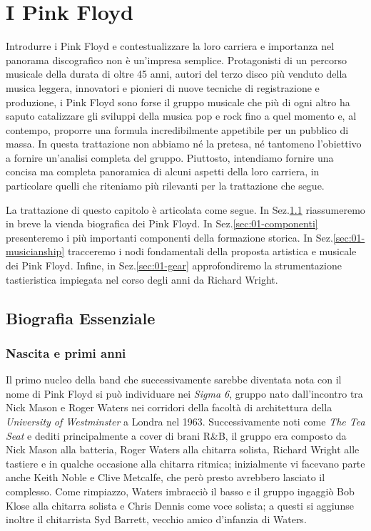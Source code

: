 \documentclass[class=book, crop=false, oneside, 12pt]{standalone}
\begin{document}
    \chapter{I Pink Floyd}
    \label{ch:01-pinkfloyd}
    Introdurre i Pink Floyd e contestualizzare la loro carriera e importanza nel panorama discografico non è un'impresa semplice. Protagonisti di un percorso musicale della durata di oltre 45 anni, autori del terzo disco più venduto della musica leggera, innovatori e pionieri di nuove tecniche di registrazione e produzione, i Pink Floyd sono forse il gruppo musicale che più di ogni altro ha saputo catalizzare gli sviluppi della musica pop e rock fino a quel momento e, al contempo, proporre una formula incredibilmente appetibile per un pubblico di massa. In questa trattazione non abbiamo né la pretesa, né tantomeno l'obiettivo a fornire un'analisi completa del gruppo. Piuttosto, intendiamo fornire una concisa ma completa panoramica di alcuni aspetti della loro carriera, in particolare quelli che riteniamo più rilevanti per la trattazione che segue. 

    La trattazione di questo capitolo è articolata come segue. In Sez.\ref{sec:01-bio} riassumeremo in breve la vienda biografica dei Pink Floyd. In Sez.\ref{sec:01-componenti} presenteremo i più importanti componenti della formazione storica. In Sez.\ref{sec:01-musicianship} tracceremo i nodi fondamentali della proposta artistica e musicale dei Pink Floyd. Infine, in Sez.\ref{sec:01-gear} approfondiremo la strumentazione tastieristica impiegata nel corso degli anni da Richard Wright.

    \section{Biografia Essenziale}\label{sec:01-bio}
    \subsection{Nascita e primi anni}
    Il primo nucleo della band che successivamente sarebbe diventata nota con il nome di Pink Floyd si può individuare nei \emph{Sigma 6}, gruppo nato dall'incontro tra Nick Mason e Roger Waters nei corridori della facoltà di architettura della \emph{University of Westminster} a Londra nel 1963. Successivamente noti come \emph{The Tea Seat} e dediti principalmente a cover di brani R\&B, il gruppo era composto da Nick Mason alla batteria, Roger Waters alla chitarra solista, Richard Wright alle tastiere e in qualche occasione alla chitarra ritmica; inizialmente vi facevano parte anche Keith Noble e Clive Metcalfe, che però presto avrebbero lasciato il complesso. Come rimpiazzo, Waters imbracciò il basso e il gruppo ingaggiò Bob Klose alla chitarra solista e Chris Dennis come voce solista; a questi si aggiunse inoltre il chitarrista Syd Barrett, vecchio amico d'infanzia di Waters.
    
\end{document}
